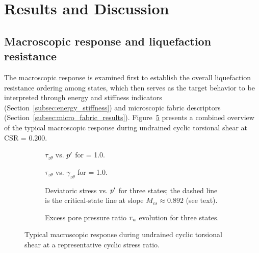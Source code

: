 \section{Results and Discussion}
\label{sec:results}

\subsection{Macroscopic response and liquefaction resistance}
\label{subsec:macro_response}

The macroscopic response is examined first to establish the overall liquefaction resistance ordering among \Kzero{} states, which then serves as the target behavior to be interpreted through energy and stiffness indicators (Section~\ref{subsec:energy_stiffness}) and microscopic fabric descriptors (Section~\ref{subsec:micro_fabric_results}). Figure~\ref{fig:macro_response} presents a combined overview of the typical macroscopic response during undrained cyclic torsional shear at CSR = 0.200.

\begin{figure}
  \centering
  \begin{subfigure}[t]{0.48\textwidth}
    \centering
    \caption{$\tau_{z\theta}$ vs. $p^\prime$ for \Kzero{} = 1.0.}
    \label{fig:macro_response_a}
  \end{subfigure}
  \hfill
  \begin{subfigure}[t]{0.48\textwidth}
    \centering
    \caption{$\tau_{z\theta}$ vs. $\gamma_{z\theta}$ for \Kzero{} = 1.0.}
    \label{fig:macro_response_b}
  \end{subfigure}

  \vspace{0.5em}

  \begin{subfigure}[t]{0.48\textwidth}
    \centering
    \caption{Deviatoric stress vs. $p^\prime$ for three \Kzero{} states; the dashed line is the critical-state line at slope $M_{cs}\approx 0.892$ (see text).}
    \label{fig:macro_response_c}
  \end{subfigure}
  \hfill
  \begin{subfigure}[t]{0.48\textwidth}
    \centering
    \caption{Excess pore pressure ratio $r_u$ evolution for three \Kzero{} states.}
    \label{fig:macro_response_d}
  \end{subfigure}
  \caption{Typical macroscopic response during undrained cyclic torsional shear at a representative cyclic stress ratio.}
  \label{fig:macro_response}
\end{figure}

